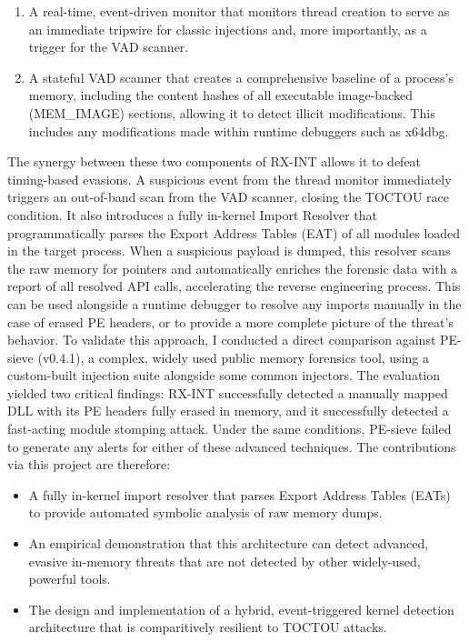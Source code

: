 \documentclass[journal]{IEEEtran}
\begin{document}
\begin{enumerate}
\item A real-time, event-driven monitor that monitors thread creation to serve as an immediate tripwire for classic injections and, more importantly, as a trigger for the VAD scanner.
\item A stateful VAD scanner that creates a comprehensive baseline of a process's memory, including the content hashes of all executable image-backed (MEM\_IMAGE) sections, allowing it to detect illicit modifications. This includes any modifications made within runtime debuggers such as x64dbg.
\end{enumerate}
The synergy between these two components of RX-INT allows it to defeat timing-based evasions. A suspicious event from the thread monitor immediately triggers an out-of-band scan from the VAD scanner, closing the TOCTOU race condition. It also introduces a fully in-kernel Import Resolver that programmatically parses the Export Address Tables (EAT) of all modules loaded in the target process. When a suspicious payload is dumped, this resolver scans the raw memory for pointers and automatically enriches the forensic data with a report of all resolved API calls, accelerating the reverse engineering process. This can be used alongside a runtime debugger to resolve any imports manually in the case of erased PE headers, or to provide a more complete picture of the threat's behavior.
To validate this approach, I conducted a direct comparison against PE-sieve (v0.4.1), a complex, widely used public memory forensics tool, using a custom-built injection suite alongside some common injectors. The evaluation yielded two critical findings: RX-INT successfully detected a manually mapped DLL with its PE headers fully erased in memory, and it successfully detected a fast-acting module stomping attack. Under the same conditions, PE-sieve failed to generate any alerts for either of these advanced techniques.
The contributions via this project are therefore:
\begin{itemize}
    \item A fully in-kernel import resolver that parses Export Address Tables (EATs) to provide automated symbolic analysis of raw memory dumps.
    \item An empirical demonstration that this architecture can detect advanced, evasive in-memory threats that are not detected by other widely-used, powerful tools.
    \item The design and implementation of a hybrid, event-triggered kernel detection architecture that is comparitively resilient to TOCTOU attacks.
\end{itemize}
\end{document}
